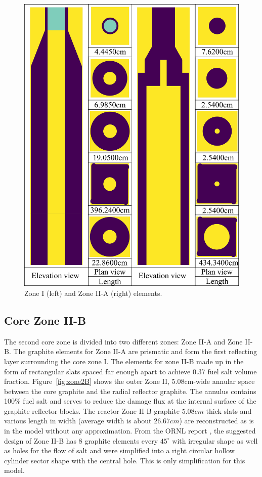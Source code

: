 \documentclass{anstrans}
\begin{document}
\begin{figure}[h] %
  \centering
  \includegraphics[width=0.96\linewidth]{figure_2_4.png}
  \caption{Zone I (left) and Zone II-A (right) elements.}
  \label{fig:zone12A}
\end{figure}

\subsection{Core Zone II-B}
The second core zone is divided into two different zones: Zone II-A and Zone II-B. The graphite elements for Zone II-A are prismatic and form the first reflecting layer surrounding the core zone I. The elements for zone II-B made up in the form of rectangular slats spaced far enough apart to achieve 0.37 fuel salt volume fraction. Figure~\ref{fig:zone2B} shows the outer Zone II, 5.08cm-wide annular space between the core graphite and the radial reflector graphite. The annulus contains 100\% fuel salt and serves to reduce the damage flux at the internal surface of the graphite reflector blocks. The reactor Zone II-B graphite $5.08cm$-thick slats and various length in width (average width is about $26.67cm$) are reconstructed as is in the model without any approximation. From the ORNL report \cite{robertson_conceptual_1971}, the suggested design of Zone II-B has 8 graphite elements every $45^\circ$ with irregular shape as well as holes for the flow of salt and were simplified into a right circular hollow cylinder sector shape with the central hole. This is only simplification for this model.
\end{document}
